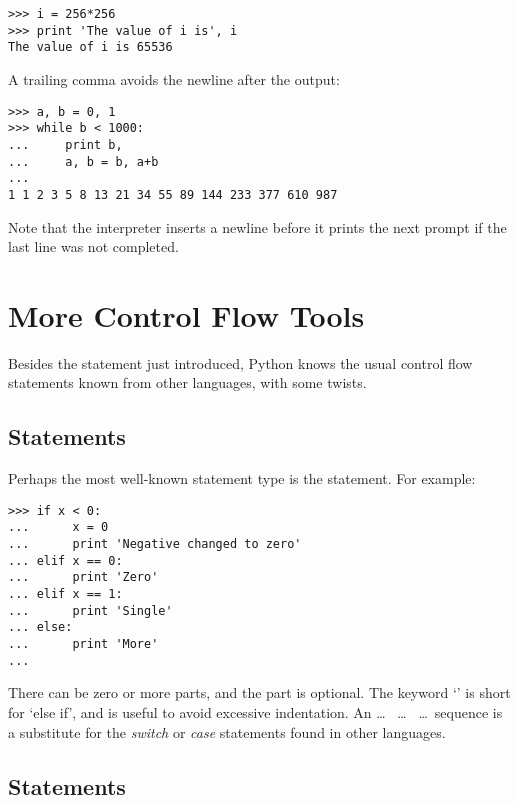 \documentclass{manual}
\begin{document}
\begin{itemize}
\begin{verbatim}
>>> i = 256*256
>>> print 'The value of i is', i
The value of i is 65536
\end{verbatim}

A trailing comma avoids the newline after the output:

\begin{verbatim}
>>> a, b = 0, 1
>>> while b < 1000:
...     print b,
...     a, b = b, a+b
... 
1 1 2 3 5 8 13 21 34 55 89 144 233 377 610 987
\end{verbatim}

Note that the interpreter inserts a newline before it prints the next
prompt if the last line was not completed.

\end{itemize}


\chapter{More Control Flow Tools}
\label{moreControl}

Besides the  statement just introduced, Python knows
the usual control flow statements known from other languages, with
some twists.

\section{ Statements}
\label{if}

Perhaps the most well-known statement type is the 
statement.  For example:

\begin{verbatim}
>>> if x < 0:
...      x = 0
...      print 'Negative changed to zero'
... elif x == 0:
...      print 'Zero'
... elif x == 1:
...      print 'Single'
... else:
...      print 'More'
... 
\end{verbatim}

There can be zero or more  parts, and the 
part is optional.  The keyword `' is short for `else
if', and is useful to avoid excessive indentation.  An
 \ldots\  \ldots\ 
\ldots\ sequence is a substitute for the  \emph{switch} or
\emph{case} statements found in other languages.

\section{ Statements}
\label{for}
\end{document}
